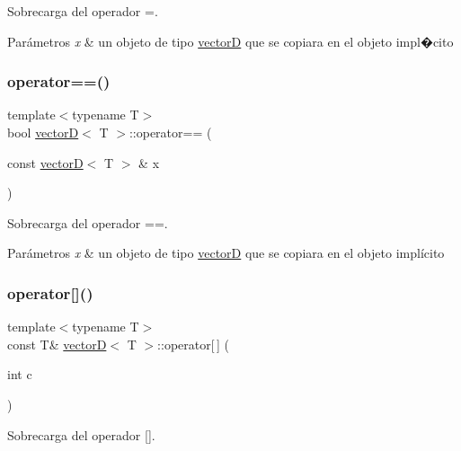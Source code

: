 Sobrecarga del operador =. 


\begin{DoxyParams}{Parámetros}
{\em x} & un objeto de tipo \hyperlink{classvectorD}{vectorD} que se copiara en el objeto impl�cito \\
\hline
\end{DoxyParams}
\mbox{\label{classvectorD_aed700403ca35827de446fe51bba78f03}} 
\subsubsection{\texorpdfstring{operator==()}{operator==()}}
{\footnotesize\ttfamily template$<$typename T$>$ \\
bool \hyperlink{classvectorD}{vectorD}$<$ T $>$\+::operator== (\begin{DoxyParamCaption}\item[{const \hyperlink{classvectorD}{vectorD}$<$ T $>$ \&}]{x }\end{DoxyParamCaption})}



Sobrecarga del operador ==. 


\begin{DoxyParams}{Parámetros}
{\em x} & un objeto de tipo \hyperlink{classvectorD}{vectorD} que se copiara en el objeto implícito \\
\hline
\end{DoxyParams}
\mbox{\label{classvectorD_a722cc52455ae7ef390f5efe68c072144}} 
\subsubsection{\texorpdfstring{operator[]()}{operator[]()}}
{\footnotesize\ttfamily template$<$typename T$>$ \\
const T\& \hyperlink{classvectorD}{vectorD}$<$ T $>$\+::operator\mbox{[}$\,$\mbox{]} (\begin{DoxyParamCaption}\item[{int}]{c }\end{DoxyParamCaption})}



Sobrecarga del operador \mbox{[}\mbox{]}. 


